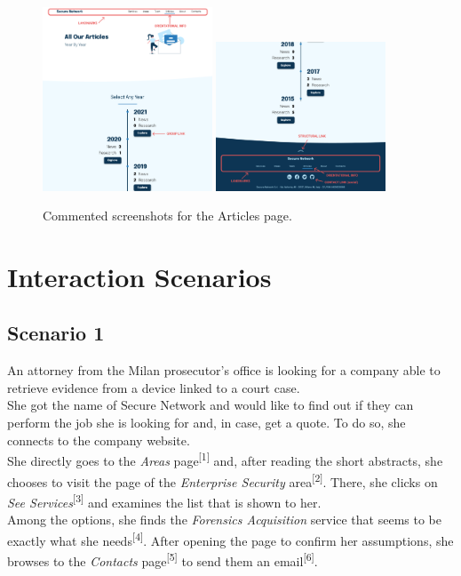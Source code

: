 \documentclass[12pt]{report}
\begin{document}
\begin{figure}[H]
	\centering
	\includegraphics[width=0.45\textwidth]{high_fid_wireframes/all_articles/1.png}
	\includegraphics[width=0.45\textwidth]{high_fid_wireframes/all_articles/2.png}
	\caption{Commented screenshots for the Articles page.}
\end{figure}

\chapter{Interaction Scenarios}

\section{Scenario 1}
An attorney from the Milan prosecutor's office is looking for a company able to retrieve evidence from a device linked to a court case.\\
\noindent
She got the name of Secure Network and would like to find out if they can perform the job she is looking for and, in case, get a quote.
To do so, she connects to the company website.\\
\noindent
She directly goes to the \emph{Areas} page\textsuperscript{[1]} and, after reading the short abstracts, she chooses to visit the page of the \emph{Enterprise Security} area\textsuperscript{[2]}.
There, she clicks on \emph{See Services}\textsuperscript{[3]} and examines the list that is shown to her.\\
\noindent
Among the options, she finds the \emph{Forensics Acquisition} service that seems to be exactly what she needs\textsuperscript{[4]}.
After opening the page to confirm her assumptions, she browses to the \emph{Contacts} page\textsuperscript{[5]} to send them an email\textsuperscript{[6]}.
\end{document}

